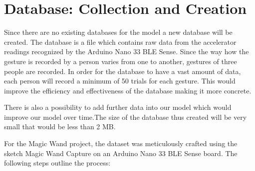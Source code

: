 \section{Database: Collection and Creation}

Since there are no existing databases for the model a new database will be created. The database is a file  which contains raw data from the accelerator  readings recognized by the Arduino Nano 33 BLE Sense. Since the way how the gesture is recorded by a person varies from one to another, gestures of three people are recorded. In order for the database to have a vast amount of data, each person will record a minimum of 50 trials for each gesture. This would improve the efficiency and  effectiveness of the database making it more concrete. 

There is also a possibility to add further data into our model which would improve our model over time.The size of the database thus created will be very small that would be less than 2 MB. \cite{Warden:2020}


For the Magic Wand project, the dataset was meticulously crafted using the sketch Magic Wand Capture  on an Arduino Nano 33 BLE Sense board. The following steps outline the process:

